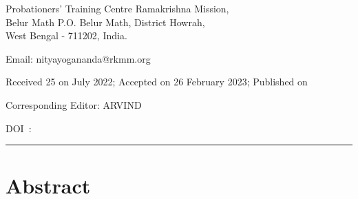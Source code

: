 \documentclass[twoside, 13pt]{article}
\begin{document}
\maketitle
 \chead[]{}{}


\noindent



\vspace{-.5cm}

Probationers’ Training Centre Ramakrishna Mission,\\ Belur Math P.O. Belur Math, District Howrah,\\ West Bengal - 711202, India.

Email: nityayogananda@rkmm.org 


\vspace{.3cm}

Received 25 on July 2022; Accepted on 26 February 2023; Published on

\vspace{.3cm}

Corresponding Editor: ARVIND

\vspace{.3cm}

DOI~:





  

\noindent\rule{\textwidth}{0.2mm}


\vspace{-.7cm}


{\fontsize{18}{20}\selectfont\section*{Abstract}}

\vspace{-.2cm}
\end{document}
